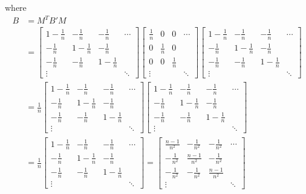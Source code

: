 where
\begin{align*}
B &= M^TB' M \\
&= 
\begin{bmatrix}
1-\frac{1}{n} & -\frac{1}{n} & -\frac{1}{n} & \cdots \\
-\frac{1}{n} & 1-\frac{1}{n} & -\frac{1}{n} & \\
-\frac{1}{n} & -\frac{1}{n} & 1-\frac{1}{n} & \\
\vdots & & & \ddots
\end{bmatrix}
\begin{bmatrix}
\frac{1}{n} & 0 & 0 & \cdots \\
0 & \frac{1}{n} & 0 & \\
0 & 0 & \frac{1}{n} & \\
\vdots & & & \ddots
\end{bmatrix}
\begin{bmatrix}
1-\frac{1}{n} & -\frac{1}{n} & -\frac{1}{n} & \cdots \\
-\frac{1}{n} & 1-\frac{1}{n} & -\frac{1}{n} & \\
-\frac{1}{n} & -\frac{1}{n} & 1-\frac{1}{n} & \\
\vdots & & & \ddots
\end{bmatrix} \\
&= \frac{1}{n}
\begin{bmatrix}
1-\frac{1}{n} & -\frac{1}{n} & -\frac{1}{n} & \cdots \\
-\frac{1}{n} & 1-\frac{1}{n} & -\frac{1}{n} & \\
-\frac{1}{n} & -\frac{1}{n} & 1-\frac{1}{n} & \\
\vdots & & & \ddots
\end{bmatrix} 
\begin{bmatrix}
1-\frac{1}{n} & -\frac{1}{n} & -\frac{1}{n} & \cdots \\
-\frac{1}{n} & 1-\frac{1}{n} & -\frac{1}{n} & \\
-\frac{1}{n} & -\frac{1}{n} & 1-\frac{1}{n} & \\
\vdots & & & \ddots
\end{bmatrix} \\
&= 
\frac{1}{n}
\begin{bmatrix}
1-\frac{1}{n} & -\frac{1}{n} & -\frac{1}{n} & \cdots \\
-\frac{1}{n} & 1-\frac{1}{n} & -\frac{1}{n} & \\
-\frac{1}{n} & -\frac{1}{n} & 1-\frac{1}{n} & \\
\vdots & & & \ddots
\end{bmatrix} =
\begin{bmatrix}
\frac{n-1}{n^2} & -\frac{1}{n^2} & -\frac{1}{n^2} & \cdots \\
 -\frac{1}{n^2} & \frac{n-1}{n^2} & -\frac{1}{n^2} & \\
 -\frac{1}{n^2} & -\frac{1}{n^2} & \frac{n-1}{n^2} & \\
\vdots & & & \ddots
\end{bmatrix}
\end{align*}
